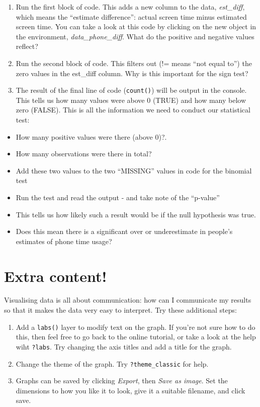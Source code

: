 \documentclass[
]{book}
\providecommand{\tightlist}{%
  \setlength{\itemsep}{0pt}\setlength{\parskip}{0pt}}
\begin{document}
\begin{enumerate}
\def\labelenumi{\arabic{enumi}.}
\item
  Run the first block of code. This adds a new column to the data, \emph{est\_diff}, which means the ``estimate difference'': actual screen time minus estimated screen time. You can take a look at this code by clicking on the new object in the environment, \emph{data\_phone\_diff}. What do the positive and negative values reflect?
\item
  Run the second block of code. This filters out (!= means ``not equal to'') the zero values in the est\_diff column. Why is this important for the sign test?
\item
  The result of the final line of code (\texttt{count()}) will be output in the console. This tells us how many values were above 0 (TRUE) and how many below zero (FALSE). This is all the information we need to conduct our statistical test:
\end{enumerate}

\begin{itemize}
\tightlist
\item
  How many positive values were there (above 0)?.
\item
  How many observations were there in total?
\item
  Add these two values to the two ``MISSING'' values in code for the binomial test
\item
  Run the test and read the output - and take note of the ``p-value''
\item
  This tells us how likely such a result would be if the null hypothesis was true.
\item
  Does this mean there is a significant over or underestimate in people's estimates of phone time usage?
\end{itemize}

\hypertarget{extra-content-2}{%
\section{Extra content!}\label{extra-content-2}}

Visualising data is all about communication: how can I communicate my results so that it makes the data very easy to interpret. Try these additional steps:

\begin{enumerate}
\def\labelenumi{\arabic{enumi}.}
\item
  Add a \texttt{labs()} layer to modify text on the graph. If you're not sure how to do this, then feel free to go back to the online tutorial, or take a look at the help wiht \texttt{?labs}. Try changing the axis titles and add a title for the graph.
\item
  Change the theme of the graph. Try \texttt{?theme\_classic} for help.
\item
  Graphs can be saved by clicking \emph{Export}, then \emph{Save as image}. Set the dimensions to how you like it to look, give it a suitable filename, and click save.
\end{enumerate}
\end{document}
